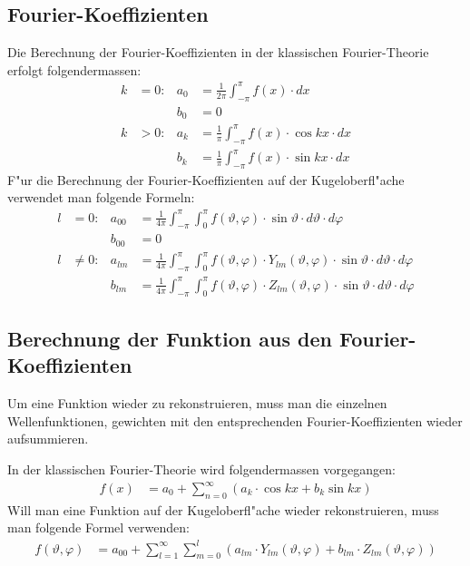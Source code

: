 \begin{refsection}
\subsection{Fourier-Koeffizienten}
Die Berechnung der Fourier-Koeffizienten in der klassischen 
Fourier-Theorie erfolgt folgendermassen:
\begin{align*}
k&= 0: & a_{0} &= \frac{1}{2\pi} \int_{-\pi}^\pi f(x) \cdot dx
\\
&  & b_{0} &= 0
\\
k& > 0: & a_{k} &= \frac{1}{\pi} \int_{-\pi}^\pi f(x) \cdot \cos kx \cdot dx
\\
& & b_{k} &= \frac{1}{\pi} \int_{-\pi}^\pi f(x) \cdot \sin kx \cdot dx
\end{align*}
F"ur die Berechnung der Fourier-Koeffizienten auf der Kugeloberfl"ache 
verwendet man folgende Formeln:
\begin{align*}
l&=0: & a_{00} &= \frac{1}{4\pi} \int_{-\pi}^\pi \int_{0}^\pi f(\vartheta,\varphi) \cdot \sin\vartheta \cdot d\vartheta \cdot d\varphi
\\
&  & b_{00} &= 0
\\
l&\ne 0: & a_{lm} &= \frac{1}{4\pi} \int_{-\pi}^\pi \int_{0}^\pi f(\vartheta,\varphi) \cdot Y_{lm} (\vartheta, \varphi) \cdot \sin\vartheta \cdot d\vartheta \cdot d\varphi
\\
&  & b_{lm} &= \frac{1}{4\pi} \int_{-\pi}^\pi \int_{0}^\pi f(\vartheta,\varphi) \cdot Z_{lm} (\vartheta, \varphi) \cdot \sin\vartheta \cdot d\vartheta \cdot d\varphi
\end{align*}

\subsection{Berechnung der Funktion aus den Fourier-Koeffizienten}
Um eine Funktion wieder zu rekonstruieren, muss man die einzelnen 
Wellenfunktionen, gewichten mit den entsprechenden Fourier-Koeffizienten 
wieder aufsummieren.

In der klassischen Fourier-Theorie wird folgendermassen vorgegangen:
\begin{equation}
\begin{aligned}
f(x)&=a_0 + \sum_{n=0}^\infty (a_k \cdot \cos kx + b_k \sin kx)
\end{aligned}
\end{equation}
Will man eine Funktion auf der Kugeloberfl"ache wieder rekonstruieren, 
muss man folgende Formel verwenden:
\begin{equation}
\begin{aligned}
f(\vartheta, \varphi) &= a_{00} + \sum_{l=1}^\infty \sum_{m=0}^l (a_{lm} \cdot Y_{lm}(\vartheta, \varphi) + b_{lm} \cdot Z_{lm}(\vartheta, \varphi))
\end{aligned}
\end{equation}

\end{refsection}
